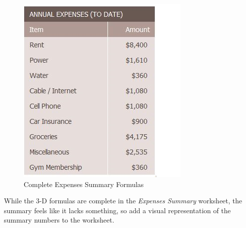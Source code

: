 \begin{figure}[H]
	\centering
	\includegraphics[width=\maxwidth{.95\linewidth}]{gfx/ch06_fig07}
	\caption{Complete Expenses Summary Formulas}
	\label{06:fig07}
\end{figure}

While the $ 3 $-D formulas are complete in the \textit{Expenses Summary} worksheet, the summary feels like it lacks something, so add a visual representation of the summary numbers to the worksheet.

